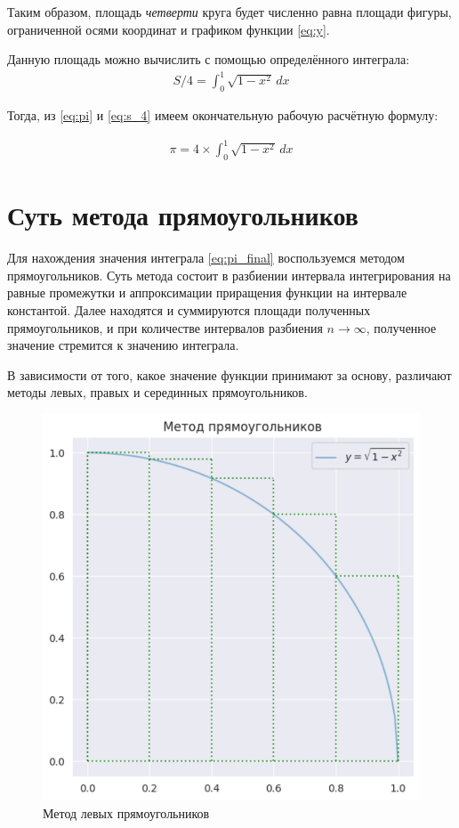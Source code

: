 \documentclass[a4paper,12pt]{article}
\begin{document}
Таким образом, площадь \textit{четверти} круга будет численно равна площади фигуры, ограниченной осями координат и графиком функции \ref{eq:y}.

Данную площадь можно вычислить с помощью определённого интеграла:
\begin{align}\label{eq:s_4}
S/4 = \int_{0}^{1} \sqrt{1-x^2} \,dx 
\end{align}

Тогда, из \ref{eq:pi} и \ref{eq:s_4} имеем окончательную рабочую расчётную формулу:

\begin{align}\label{eq:pi_final}
    \pi = 4 \times \int_{0}^{1} \sqrt{1-x^2} \,dx 
\end{align}

\section{Суть метода прямоугольников}

Для нахождения значения интеграла \ref{eq:pi_final} воспользуемся методом прямоугольников. Суть метода состоит в разбиении интервала интегрирования на равные промежутки и аппроксимации приращения функции на интервале константой. 
Далее находятся и суммируются площади полученных прямоугольников, и при количестве интервалов разбиения $ n \rightarrow \infty $, полученное значение стремится к значению интеграла.

В зависимости от того, какое значение функции принимают за основу, различают методы левых, правых и серединных прямоугольников.

\begin{figure}[h]
    \begin{center}
    \includegraphics[width=12cm]{rect.png}    
    \caption{Метод левых прямоугольников}
    \label{left_rect}
    \end{center}
\end{figure}
\end{document}
